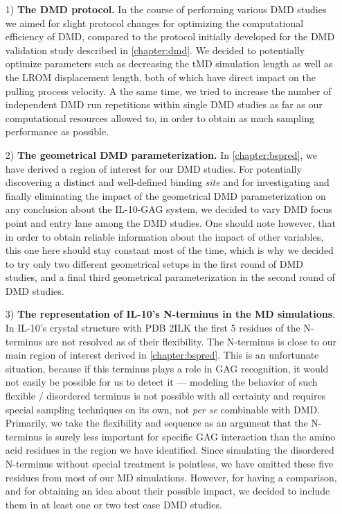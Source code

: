 \begin{itemize}

\item[1)] \textbf{The DMD protocol.} In the course of performing various DMD
studies we aimed for slight protocol changes for optimizing the computational
efficiency of DMD, compared to the protocol initially developed for the DMD
validation study described in \cref{chapter:dmd}. We decided to potentially
optimize parameters such as decreasing the tMD simulation length as well as the
LROM displacement length, both of which have direct impact on the pulling
process velocity. A the same time, we tried to increase the number of
independent DMD run repetitions within single DMD studies as far as our
computational resources allowed to, in order to obtain as much sampling
performance as possible.

\item[2)] \textbf{The geometrical DMD parameterization.} In
\cref{chapter:bspred}, we have derived a region of interest for our DMD studies.
For potentially discovering a distinct and well-defined binding \textit{site}
and for investigating and finally eliminating the impact of the geometrical DMD
parameterization on any conclusion about the IL-10-GAG system, we decided to
vary DMD focus point and entry lane among the DMD studies. One should note
however, that in order to obtain reliable information about the impact of other
variables, this one here should stay constant most of the time, which is why we
decided to try only two different geometrical setups in the first round of DMD
studies, and a final third geometrical parameterization in the second round of
DMD studies.

\item[3)] \textbf{The representation of IL-10's N-terminus in the MD
simulations}. In IL-10's crystal structure with PDB 2ILK the first 5 residues of
the N-terminus are not resolved as of their flexibility. The N-terminus is close
to our main region of interest derived in \cref{chapter:bspred}. This is an
unfortunate situation, because if this terminus plays a role in GAG recognition,
it would not easily be possible for us to detect it --- modeling the behavior of
such flexible / disordered terminus is not possible with all certainty and
requires special sampling techniques on its own, not \textit{per se} combinable
with DMD. Primarily, we take the flexibility and sequence as an argument that
the N-terminus is surely less important for specific GAG interaction than the
amino acid residues in the region we have identified. Since simulating the
disordered N-terminus without special treatment is pointless, we have omitted
these five residues from most of our MD simulations. However, for having a
comparison, and for obtaining an idea about their possible impact, we decided to
include them in at least one or two test case DMD studies.


\end{itemize}
